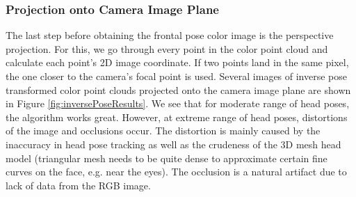 \subsubsection{Projection onto Camera Image Plane}
The last step before obtaining the frontal pose color image is the perspective projection.  For this, we go through every point in the color point cloud and calculate each point's 2D image coordinate.  If two points land in the same pixel, the one closer to the camera's focal point is used.  Several images of inverse pose transformed color point clouds projected onto the camera image plane are shown in Figure \ref{fig:inversePoseResults}.  We see that for moderate range of head poses, the algorithm works great.  However, at extreme range of head poses, distortions of the image and occlusions occur.  The distortion is mainly caused by the inaccuracy in head pose tracking as well as the crudeness of the 3D mesh head model (triangular mesh needs to be quite dense to approximate certain fine curves on the face, e.g. near the eyes).  The occlusion is a natural artifact due to lack of data from the RGB image.

